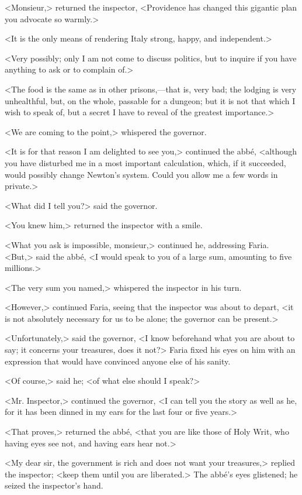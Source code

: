 <Monsieur,> returned the inspector, <Providence has changed this gigantic plan you advocate so warmly.> 

 <It is the only means of rendering Italy strong, happy, and independent.> 

 <Very possibly; only I am not come to discuss politics, but to inquire if you have anything to ask or to complain of.> 

 <The food is the same as in other prisons,—that is, very bad; the lodging is very unhealthful, but, on the whole, passable for a dungeon; but it is not that which I wish to speak of, but a secret I have to reveal of the greatest importance.> 

 <We are coming to the point,> whispered the governor. 

 <It is for that reason I am delighted to see you,> continued the abbé, <although you have disturbed me in a most important calculation, which, if it succeeded, would possibly change Newton's system. Could you allow me a few words in private.> 

 <What did I tell you?> said the governor. 

 <You knew him,> returned the inspector with a smile. 

 <What you ask is impossible, monsieur,> continued he, addressing Faria.  <But,> said the abbé, <I would speak to you of a large sum, amounting to five millions.> 

 <The very sum you named,> whispered the inspector in his turn. 

 <However,> continued Faria, seeing that the inspector was about to depart, <it is not absolutely necessary for us to be alone; the governor can be present.> 

 <Unfortunately,> said the governor, <I know beforehand what you are about to say; it concerns your treasures, does it not?> Faria fixed his eyes on him with an expression that would have convinced anyone else of his sanity. 

 <Of course,> said he; <of what else should I speak?> 

 <Mr. Inspector,> continued the governor, <I can tell you the story as well as he, for it has been dinned in my ears for the last four or five years.> 

 <That proves,> returned the abbé, <that you are like those of Holy Writ, who having eyes see not, and having ears hear not.> 

 <My dear sir, the government is rich and does not want your treasures,> replied the inspector; <keep them until you are liberated.> The abbé's eyes glistened; he seized the inspector's hand. 

